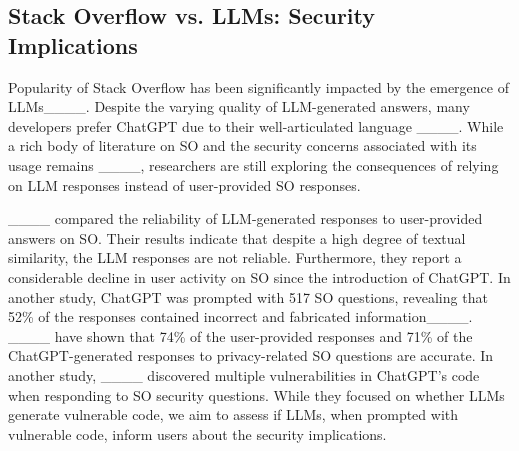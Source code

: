 \subsection{Stack Overflow vs. LLMs: Security Implications} 
\label{concerns_in_llms_vs_SO}
Popularity of Stack Overflow has been significantly impacted by the emergence of LLMs____. Despite the varying quality of LLM-generated answers, many developers prefer ChatGPT due to their well-articulated language ____. While a rich body of literature on SO and the security concerns associated with its usage remains ____, researchers are still exploring the consequences of relying on LLM responses instead of user-provided SO responses. 

____ compared the reliability of LLM-generated responses to user-provided answers on SO. Their results indicate that despite a high degree of textual similarity, the LLM responses are not reliable. Furthermore, they report a considerable decline in user activity on SO since the introduction of ChatGPT. %
In another study, ChatGPT was prompted with 517 SO questions, revealing that 52\% of the responses contained incorrect and fabricated information____. %
____ have shown that 74\% of the user-provided responses and 71\% of the ChatGPT-generated responses to privacy-related SO questions are accurate. In another study, ____ discovered multiple vulnerabilities in ChatGPT's code when responding to SO security questions. While they focused on whether LLMs generate vulnerable code, we aim to assess if LLMs, when prompted with vulnerable code, inform users about the security implications.

